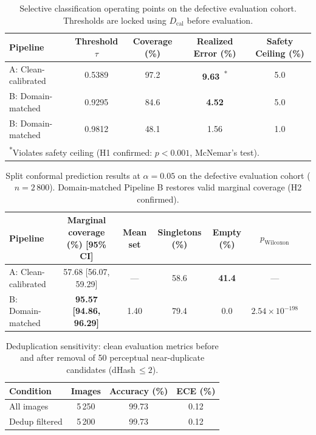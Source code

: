 \documentclass[5p,times,twocolumn]{elsarticle}
\begin{document}
\begin{table}[t]
  \centering
  \caption{Selective classification operating points on the defective evaluation cohort.
           Thresholds are locked using $D_{\text{cal}}$ before evaluation.}
  \label{tab:selective}
  \begin{tabular}{lcccc}
    \toprule
    Pipeline & Threshold $\tau$ & Coverage (\%) & Realized Error (\%) & Safety Ceiling (\%) \\
    \midrule
    A: Clean-calibrated & 0.5389 & 97.2 & \textbf{9.63}~\textsuperscript{*} & 5.0 \\
    B: Domain-matched   & 0.9295 & 84.6 & \textbf{4.52} & 5.0 \\
    B: Domain-matched   & 0.9812 & 48.1 & 1.56 & 1.0 \\
    \bottomrule
    \multicolumn{5}{l}{\textsuperscript{*}Violates safety ceiling (H1 confirmed: $p < 0.001$, McNemar's test).}
  \end{tabular}
\end{table}

\begin{table}[t]
  \centering
  \caption{Split conformal prediction results at $\alpha=0.05$ on the defective
           evaluation cohort ($n=2\,800$). Domain-matched Pipeline B restores valid
           marginal coverage (H2 confirmed).}
  \label{tab:conformal}
  \begin{tabular}{lcccccc}
    \toprule
    Pipeline & Marginal coverage (\%) [95\% CI] & Mean set & Singletons (\%) & Empty (\%) & $p_{\text{Wilcoxon}}$ \\
    \midrule
    A: Clean-calibrated & 57.68 [56.07, 59.29] & --- & 58.6 & \textbf{41.4} & --- \\
    B: Domain-matched   & \textbf{95.57 [94.86, 96.29]} & 1.40 & 79.4 & 0.0 & $2.54\times10^{-198}$ \\
    \bottomrule
  \end{tabular}
\end{table}

\begin{table}[t]
  \centering
  \caption{Deduplication sensitivity: clean evaluation metrics before and after
           removal of 50 perceptual near-duplicate candidates (dHash\,$\leq2$).}
  \label{tab:dedup}
  \begin{tabular}{lccc}
    \toprule
    Condition & Images & Accuracy (\%) & ECE (\%) \\
    \midrule
    All images     & 5\,250 & 99.73 & 0.12 \\
    Dedup filtered & 5\,200 & 99.73 & 0.12 \\
    \bottomrule
  \end{tabular}
\end{table}
\end{document}
